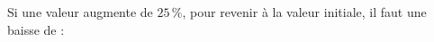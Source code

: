 
Si une valeur augmente de $25\,\%$, pour revenir à la valeur initiale, il faut une baisse de :

\smallskip

